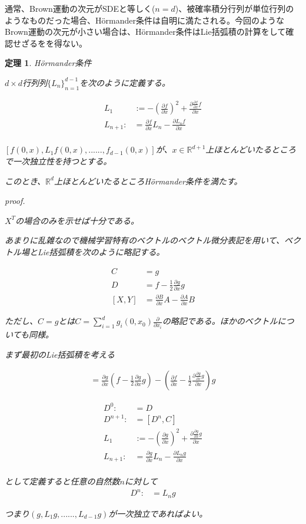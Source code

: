 \documentclass{jsarticle}
\newtheorem{theo}{定理}[section]
\begin{document}
通常、Brown運動の次元がSDEと等しく($n=d$)、被確率積分行列が単位行列のようなものだった場合、Hörmander条件は自明に満たされる。今回のようなBrown運動の次元が小さい場合は、Hörmander条件はLie括弧積の計算をして確認せざるをを得ない。




\begin{theo} Hörmander条件

$d\times d$行列列$\{L_n\}^{d-1}_{n=1}$を次のように定義する。

\begin{align}
L_1&:=-(\frac{\partial f}{\partial x})^2+\frac{\partial \frac{\partial f}{\partial x}f}{\partial x}\\
L_{n+1}:&=\frac{\partial f}{\partial x}L_n-\frac{\partial L_n f}{\partial x}\\
\end{align}

$[f(0,x),L_1f(0,x),......,f_{d-1}(0,x)]$が、$x\in \mathbb{R}^{d+1}$上ほとんどいたるところで一次独立性を持つとする。

このとき、$\mathbb{R}^d$上ほとんどいたるところHörmander条件を満たす。



proof.

$X^T$の場合のみを示せば十分である。

あまりに乱雑なので機械学習特有のベクトルのベクトル微分表記を用いて、ベクトル場とLie括弧積を次のように略記する。

\begin{align}
C&=g\\
D&=f-\frac{1}{2}\frac{\partial g}{\partial x}g\\
[X,Y]&=\frac{\partial B}{\partial x}A-\frac{\partial A}{\partial x}B
\end{align}

ただし、$C=g$とは$C=\sum^d_{i=1}g_i(0,x_0)\frac{\partial}{\partial x_i}$の略記である。ほかのベクトルについても同様。

まず最初のLie括弧積を考える

\begin{align}
[D,C]=\frac{\partial g}{\partial x}(f-\frac{1}{2}\frac{\partial g}{\partial x}g ) -(\frac{\partial f}{\partial x}-\frac{1}{2}\frac{\partial \frac{\partial g}{\partial x}g}{\partial x})g
\end{align}

\begin{align}
D^0:&=D\\
D^{n+1}:&=[D^n,C]\\
L_1&:=-(\frac{\partial g}{\partial x})^2+\frac{\partial \frac{\partial g}{\partial x}g}{\partial x}\\
L_{n+1}:&=\frac{\partial g}{\partial x}L_n-\frac{\partial L_n g}{\partial x}\\
\end{align}

として定義すると任意の自然数$n$に対して
\begin{align}
D^{n}:&=L_ng
\end{align}

つまり$(g,L_1g,......,L_{d-1}g)$が一次独立であればよい。

\end{theo}
\end{document}
